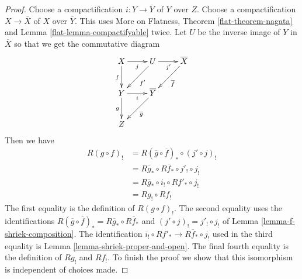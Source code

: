 \documentclass{stacks-project}
\theoremstyle{plain}
\theoremstyle{definition}
\theoremstyle{remark}
\numberwithin{equation}{subsection}
\begin{document}
\begin{proof}
Choose a compactification $i : Y \to \overline{Y}$ of $Y$ over $Z$.
Choose a compactification $X \to \overline{X}$ of $X$ over
$\overline{Y}$. This uses More on Flatness, Theorem \ref{flat-theorem-nagata}
and Lemma \ref{flat-lemma-compactifyable} twice.
Let $U$ be the inverse image of $Y$ in $\overline{X}$
so that we get the commutative diagram
$$
\xymatrix{
X \ar[r]_j \ar[d]_f &
U \ar[dl]^{f'} \ar[r]_{j'} &
\overline{X} \ar[dl]^{\overline{f}} \\
Y \ar[r]_i \ar[d]_g &
\overline{Y} \ar[dl]^{\overline{g}} \\
Z
}
$$
Then we have
\begin{align*}
R(g \circ f)_!
& =
R(\overline{g} \circ \overline{f})_* \circ (j' \circ j)_! \\
& =
R\overline{g}_* \circ R\overline{f}_* \circ j'_! \circ j_! \\
& =
R\overline{g}_* \circ i_! \circ Rf'_* \circ j_! \\
& =
Rg_! \circ Rf_!
\end{align*}
The first equality is the definition of $R(g \circ f)_!$.
The second equality uses the identifications
$R(\overline{g} \circ \overline{f})_* = R\overline{g}_* \circ R\overline{f}_*$
and $(j' \circ j)_! = j'_! \circ j_!$ of Lemma \ref{lemma-f-shriek-composition}.
The identification $i_! \circ Rf'_* \to R\overline{f}_* \circ j_!$
used in the third equality is Lemma \ref{lemma-shriek-proper-and-open}.
The final fourth equality is the definition of $Rg_!$ and $Rf_!$.
To finish the proof we show that
this isomorphism is independent of choices made.


\end{proof}
\end{document}

